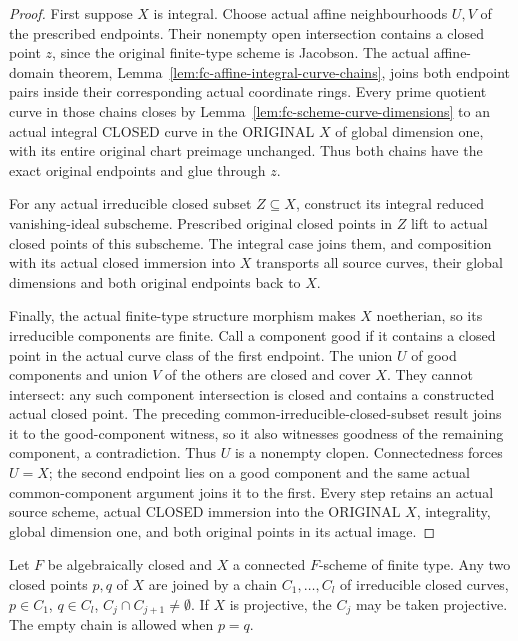 \begin{proof}
First suppose $X$ is integral. Choose actual affine neighbourhoods $U,V$ of the prescribed endpoints.
Their nonempty open intersection contains a closed point $z$, since the original finite-type scheme
is Jacobson. The actual affine-domain theorem, Lemma~\ref{lem:fc-affine-integral-curve-chains}, joins
both endpoint pairs inside their corresponding actual coordinate rings. Every prime quotient curve
in those chains closes by Lemma~\ref{lem:fc-scheme-curve-dimensions} to an actual integral CLOSED
curve in the ORIGINAL $X$ of global dimension one, with its entire original chart preimage unchanged.
Thus both chains have the exact original endpoints and glue through $z$.

For any actual irreducible closed subset $Z\subseteq X$, construct its integral reduced vanishing-ideal
subscheme. Prescribed original closed points in $Z$ lift to actual closed points of this subscheme.
The integral case joins them, and composition with its actual closed immersion into $X$ transports
all source curves, their global dimensions and both original endpoints back to $X$.

Finally, the actual finite-type structure morphism makes $X$ noetherian, so its irreducible components
are finite. Call a component good if it contains a closed point in the actual curve class of the first
endpoint. The union $U$ of good components and union $V$ of the others are closed and cover $X$.
They cannot intersect: any such component intersection is closed and contains a constructed actual
closed point. The preceding common-irreducible-closed-subset result joins it to the good-component
witness, so it also witnesses goodness of the remaining component, a contradiction. Thus $U$ is a
nonempty clopen. Connectedness forces $U=X$; the second endpoint lies on a good component and the
same actual common-component argument joins it to the first. Every step retains an actual source
scheme, actual CLOSED immersion into the ORIGINAL $X$, integrality, global dimension one, and
both original points in its actual image.
\end{proof}

\begin{lemma}\label{lem:fc-curve-chains}
\leanok
{}
Let $F$ be algebraically closed and $X$ a connected $F$-scheme of finite type. Any two closed points $p,q$ of $X$ are
joined by a chain $C_1,\dots,C_l$ of irreducible closed curves, $p\in C_1$, $q\in C_l$, $C_j\cap C_{j+1}\ne\emptyset$. If $X$ is
projective, the $C_j$ may be taken projective. The empty chain is allowed when $p=q$.
\end{lemma}

